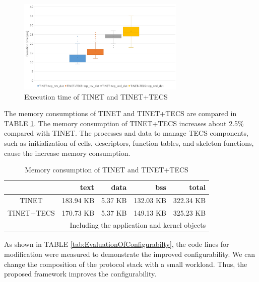 \documentclass[conference]{IEEEtran/IEEEtran}
\begin{document}
\begin{figure}[t]
    \centering
    \includegraphics[width=8.0cm,clip]{figure/EvaluationOfExecutionTime.pdf}
    \caption{Execution time of TINET and TINET+TECS}
    \label{fig:EvaluationOfExecutionTime}
\end{figure}

The memory consumptions of TINET and TINET+TECS are compared in TABLE \ref{tab:EvaluationOfMemoryConsumption}.
The memory consumption of TINET+TECS increases about 2.5\% compared with TINET.
The processes and data to manage TECS components, such as initialization of cells, descriptors, function tables, and skeleton functions, cause the increase memory consumption.

\begin{table}[t]
    \centering
    \caption{Memory consumption of TINET and TINET+TECS}
    \begin{tabular}{c|r|r|r|r}
        \hline\hline
                    &   text       &  data    &   bss      &  total     \\ \hline
        TINET       &   183.94 KB  &  5.37 KB &  132.03 KB &  322.34 KB \\
        TINET+TECS  &   170.73 KB  &  5.37 KB &  149.13 KB &  325.23 KB \\
        \hline
        \multicolumn{5}{r}{Including the application and kernel objects}
    \end{tabular}
    \label{tab:EvaluationOfMemoryConsumption}
\end{table}

As shown in TABLE \ref{tab:EvaluationOfConfigurabilty}, the code lines for modification were measured to demonstrate the improved configurability.
We can change the composition of the protocol stack with a small workload.
Thus, the proposed framework improves the configurability.
\end{document}
